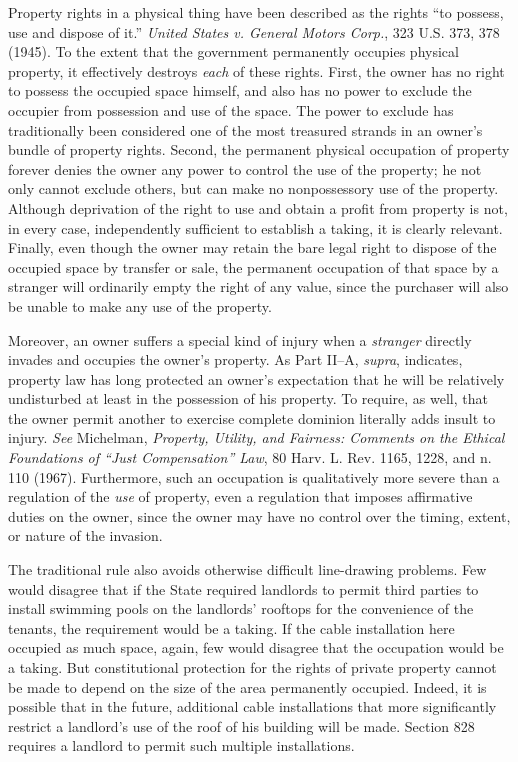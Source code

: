 Property rights in a physical thing have been described as the rights ``to
possess, use and dispose of it.'' \textit{United States v. General Motors
Corp.}, 323 U.S. 373, 378 (1945). To the extent that the government permanently
occupies physical property, it effectively destroys \textit{each} of these
rights. First, the owner has no right to possess the occupied space himself, and
also has no power to exclude the occupier from possession and use of the space.
The power to exclude has traditionally been considered one of the most treasured
strands in an owner's bundle of property rights. Second, the permanent physical
occupation of property forever denies the owner any power to control the use of
the property; he not only cannot exclude others, but can make no nonpossessory
use of the property. Although deprivation of the right to use and obtain a
profit from property is not, in every case, independently sufficient to
establish a taking, it is clearly relevant. Finally, even though the owner may
retain the bare legal right to dispose of the occupied space by transfer or
sale, the permanent occupation of that space by a stranger will ordinarily empty
the right of any value, since the purchaser will also be unable to make any use
of the property.

Moreover, an owner suffers a special kind of injury when a \textit{stranger}
directly invades and occupies the owner's property. As Part II--A,
\textit{supra}, indicates, property law has long protected an owner's
expectation that he will be relatively undisturbed at least in the possession of
his property. To require, as well, that the owner permit another to exercise
complete dominion literally adds insult to injury. \emph{See} Michelman,
\emph{Property,
Utility, and Fairness: Comments on the Ethical Foundations of ``Just
Compensation'' Law}, 80 Harv. L. Rev. 1165, 1228, and n. 110 (1967).
Furthermore,
such an occupation is qualitatively more severe than a regulation of the
\textit{use} of property, even a regulation that imposes affirmative duties on
the owner, since the owner may have no control over the timing, extent, or
nature of the invasion. 

The traditional rule also avoids otherwise difficult line-drawing problems. Few
would disagree that if the State required landlords to permit third parties to
install swimming pools on the landlords' rooftops for the convenience of the
tenants, the requirement would be a taking. If the cable installation here
occupied as much space, again, few would disagree that the occupation would be a
taking. But constitutional protection for the rights of private property cannot
be made to depend on the size of the area permanently occupied. Indeed, it is
possible that in the future, additional cable installations that more
significantly restrict a landlord's use of the roof of his building will be
made. Section 828 requires a landlord to permit such multiple installations.

